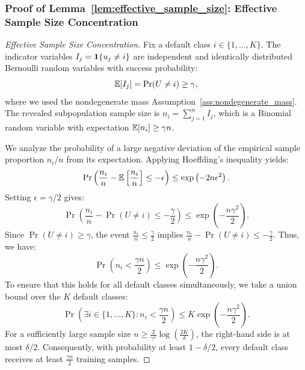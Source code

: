 \subsubsection*{Proof of Lemma~\ref{lem:effective_sample_size}: Effective Sample Size Concentration}
\label{app:proof_effective_sample_size}
\begin{proof}[Effective Sample Size Concentration]
Fix a default class $i \in \{1, \dots, K\}$. The indicator variables $I_j = \mathbf{1}\{u_j \ne i\}$ are independent and identically distributed Bernoulli random variables with success probability:
\begin{equation}
    \mathbb{E}[I_j] = \Pr(U \ne i) \ge \gamma,
\end{equation}
where we used the nondegenerate mass Assumption~\ref{ass:nondegenerate_mass}.
The revealed subpopulation sample size is $n_i = \sum_{j=1}^n I_j$, which is a Binomial random variable with expectation $\mathbb{E}[n_i] \ge \gamma n$.

We analyze the probability of a large negative deviation of the empirical sample proportion $n_i/n$ from its expectation. Applying Hoeffding's inequality yields:
\begin{equation}
    \Pr\left( \frac{n_i}{n} - \mathbb{E}\left[ \frac{n_i}{n} \right] \le - \epsilon \right) \le \exp\left( -2n \epsilon^2 \right).
\end{equation}
Setting $\epsilon = \gamma/2$ gives:
\begin{equation}
    \Pr\left( \frac{n_i}{n} - \Pr(U \ne i) \le - \frac{\gamma}{2} \right) \le \exp\left( - \frac{n \gamma^2}{2} \right).
\end{equation}
Since $\Pr(U \ne i) \ge \gamma$, the event $\frac{n_i}{n} \le \frac{\gamma}{2}$ implies $\frac{n_i}{n} - \Pr(U \ne i) \le - \frac{\gamma}{2}$. Thus, we have:
\begin{equation}
    \Pr\left( n_i < \frac{\gamma n}{2} \right) \le \exp\left( - \frac{n \gamma^2}{2} \right).
\end{equation}
To ensure that this holds for all default classes simultaneously, we take a union bound over the $K$ default classes:
\begin{equation}
    \Pr\left( \exists i \in \{1, \dots, K\} : n_i < \frac{\gamma n}{2} \right) \le K \exp\left( - \frac{n \gamma^2}{2} \right).
\end{equation}
For a sufficiently large sample size $n \ge \frac{2}{\gamma^2}\log\left(\frac{2K}{\delta}\right)$, the right-hand side is at most $\delta/2$. Consequently, with probability at least $1 - \delta/2$, every default class receives at least $\frac{\gamma n}{2}$ training samples.
\end{proof}

